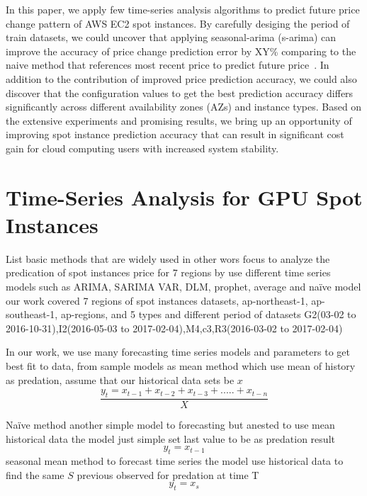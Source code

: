 \documentclass[graybox]{svmult}
\begin{document}
In this paper, we apply few time-series analysis algorithms to predict future price change pattern of AWS EC2 spot instances. By carefully desiging the period of train datasets, we could uncover that applying seasonal-arima (s-arima) can improve the accuracy of price change prediction error by XY\% comparing to the naive method that references most recent price to predict future price~\cite{deep-spot-cloud}. In addition to the contribution of improved price prediction accuracy, we could also discover that the configuration values to get the best prediction accuracy differs significantly across different availability zones (AZs) and instance types. Based on the extensive experiments and promising results, we bring up an opportunity of improving spot instance prediction accuracy that can result in significant cost gain for cloud computing users with increased system stability.


\section{Time-Series Analysis for GPU Spot Instances}
List basic methods that are widely used in other wors
focus to analyze the predication of spot instances price for 7 regions by use different time series models such as ARIMA, SARIMA VAR, DLM, prophet, average and naïve model
our work covered  7 regions of spot instances datasets, ap-northeast-1, ap-southeast-1, ap-regions, and 5 types and different period of datasets G2(03-02 to 2016-10-31),I2(2016-05-03 to 2017-02-04),M4,c3,R3(2016-03-02 to 2017-02-04)



In our work, we use many forecasting time series models and parameters to get best fit to data, from sample models as mean method which use mean of history as predation, assume that our historical data sets be \(x\)
\begin{equation}
 \frac{y_t = x_{t-1} +x_{t-2}+ x_{t-3}+.....+x_{t-n}}{X}
\label{mean}
\end{equation} 

Naïve method another simple model to forecasting but anested to use mean historical data the model just simple set last value to be as predation result 
\begin{equation}
 y_t = x_{t-1} 
\label{naive}
\end{equation}
seasonal mean method to forecast time series the model use historical data to find the same \(S\) previous observed for predation at time T 
\begin{equation}
 y_t = x_s 
\label{smean}
\end{equation}
\end{document}
